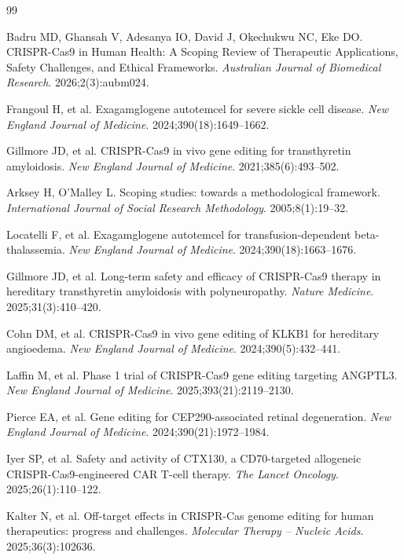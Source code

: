 \documentclass[11pt,a4paper]{article}
\begin{document}
\begingroup
\small
\setlength{\parskip}{0pt}
\begin{thebibliography}{99}

Badru MD, Ghansah V, Adesanya IO, David J, Okechukwu NC, Eke DO.
CRISPR-Cas9 in Human Health: A Scoping Review of Therapeutic Applications, Safety Challenges, and Ethical Frameworks.
\textit{Australian Journal of Biomedical Research}. 2026;2(3):aubm024.

Frangoul H, et al.
Exagamglogene autotemcel for severe sickle cell disease.
\textit{New England Journal of Medicine}. 2024;390(18):1649--1662.

Gillmore JD, et al.
CRISPR-Cas9 in vivo gene editing for transthyretin amyloidosis.
\textit{New England Journal of Medicine}. 2021;385(6):493--502.

Arksey H, O'Malley L.
Scoping studies: towards a methodological framework.
\textit{International Journal of Social Research Methodology}. 2005;8(1):19--32.

Locatelli F, et al.
Exagamglogene autotemcel for transfusion-dependent beta-thalassemia.
\textit{New England Journal of Medicine}. 2024;390(18):1663--1676.

Gillmore JD, et al.
Long-term safety and efficacy of CRISPR-Cas9 therapy in hereditary transthyretin amyloidosis with polyneuropathy.
\textit{Nature Medicine}. 2025;31(3):410--420.

Cohn DM, et al.
CRISPR-Cas9 in vivo gene editing of KLKB1 for hereditary angioedema.
\textit{New England Journal of Medicine}. 2024;390(5):432--441.

Laffin M, et al.
Phase 1 trial of CRISPR-Cas9 gene editing targeting ANGPTL3.
\textit{New England Journal of Medicine}. 2025;393(21):2119--2130.

Pierce EA, et al.
Gene editing for CEP290-associated retinal degeneration.
\textit{New England Journal of Medicine}. 2024;390(21):1972--1984.

Iyer SP, et al.
Safety and activity of CTX130, a CD70-targeted allogeneic CRISPR-Cas9-engineered CAR T-cell therapy.
\textit{The Lancet Oncology}. 2025;26(1):110--122.

Kalter N, et al.
Off-target effects in CRISPR-Cas genome editing for human therapeutics: progress and challenges.
\textit{Molecular Therapy -- Nucleic Acids}. 2025;36(3):102636.


\end{thebibliography}
\end{document}
